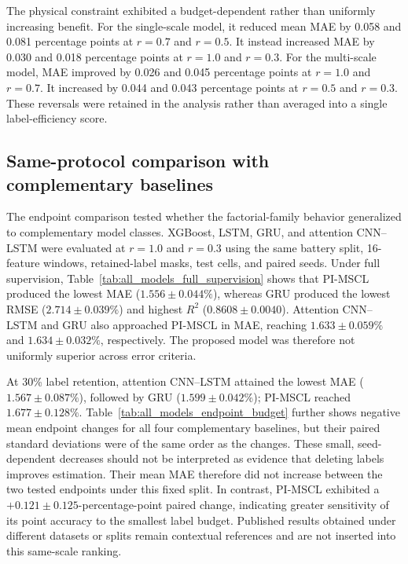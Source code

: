 \documentclass[pdflatex,sn-mathphys-num]{sn-jnl}
\begin{document}



The physical constraint exhibited a budget-dependent rather than uniformly increasing benefit. For the single-scale model, it reduced mean MAE by 0.058 and 0.081 percentage points at $r=0.7$ and $r=0.5$. It instead increased MAE by 0.030 and 0.018 percentage points at $r=1.0$ and $r=0.3$. For the multi-scale model, MAE improved by 0.026 and 0.045 percentage points at $r=1.0$ and $r=0.7$. It increased by 0.044 and 0.043 percentage points at $r=0.5$ and $r=0.3$. These reversals were retained in the analysis rather than averaged into a single label-efficiency score.

\subsection{Same-protocol comparison with complementary baselines}
\label{subsec:new_extended_baselines}

The endpoint comparison tested whether the factorial-family behavior generalized to complementary model classes. XGBoost, LSTM, GRU, and attention CNN--LSTM were evaluated at $r=1.0$ and $r=0.3$ using the same battery split, 16-feature windows, retained-label masks, test cells, and paired seeds. Under full supervision, Table~\ref{tab:all_models_full_supervision} shows that PI-MSCL produced the lowest MAE ($1.556\pm0.044\%$), whereas GRU produced the lowest RMSE ($2.714\pm0.039\%$) and highest $R^2$ ($0.8608\pm0.0040$). Attention CNN--LSTM and GRU also approached PI-MSCL in MAE, reaching $1.633\pm0.059\%$ and $1.634\pm0.032\%$, respectively. The proposed model was therefore not uniformly superior across error criteria.



At 30\% label retention, attention CNN--LSTM attained the lowest MAE ($1.567\pm0.087\%$), followed by GRU ($1.599\pm0.042\%$); PI-MSCL reached $1.677\pm0.128\%$. Table~\ref{tab:all_models_endpoint_budget} further shows negative mean endpoint changes for all four complementary baselines, but their paired standard deviations were of the same order as the changes. These small, seed-dependent decreases should not be interpreted as evidence that deleting labels improves estimation. Their mean MAE therefore did not increase between the two tested endpoints under this fixed split. In contrast, PI-MSCL exhibited a $+0.121\pm0.125$-percentage-point paired change, indicating greater sensitivity of its point accuracy to the smallest label budget. Published results obtained under different datasets or splits remain contextual references and are not inserted into this same-scale ranking.
\end{document}
